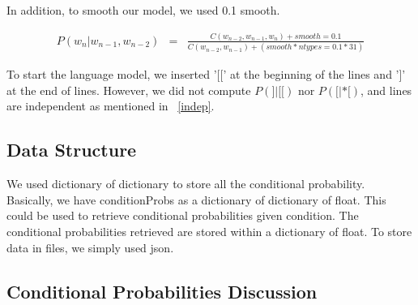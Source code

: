 \documentclass{article}
\begin{document}
In addition, to smooth our model, we used 0.1 smooth.

\begin{eqnarray*}
	P(w_n|w_{n-1},w_{n-2}) &=& \frac{C(w_{n-2},w_{n-1},w_n)+smooth=0.1}{C(w_{n-2},w_{n-1})+(smooth*ntypes = 0.1*31)}
\end{eqnarray*}

To start the language model, we inserted '[[' at the beginning of the lines and ']' at the end of lines. However, we did not compute $P(]|[[)$ nor  $P([|*[)$, and lines are independent as mentioned in ~\ref{indep}.

\subsection{Data Structure}
We used dictionary of dictionary to store all the conditional probability. Basically, we have conditionProbs as a dictionary of dictionary of float. This could be used to retrieve conditional probabilities given condition. The conditional probabilities retrieved are stored within a dictionary of float. To store data in files, we simply used json.
\subsection{Conditional Probabilities Discussion}
\end{document}
